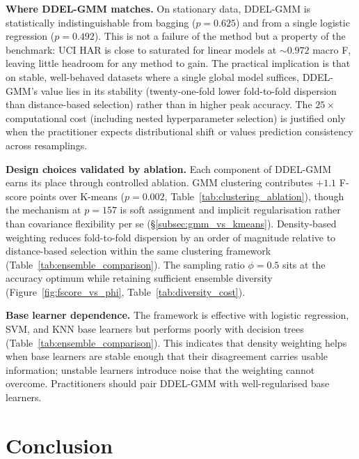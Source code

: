 \documentclass[lettersize,journal]{IEEEtran}
\begin{document}
	\textbf{Where DDEL-GMM matches.} On stationary data, DDEL-GMM is statistically indistinguishable from bagging ($p = 0.625$) and from a single logistic regression ($p = 0.492$). This is not a failure of the method but a property of the benchmark: UCI HAR is close to saturated for linear models at $\sim 0.972$ macro F, leaving little headroom for any method to gain. The practical implication is that on stable, well-behaved datasets where a single global model suffices, DDEL-GMM's value lies in its stability (twenty-one-fold lower fold-to-fold dispersion than distance-based selection) rather than in higher peak accuracy. The $25\times$ computational cost (including nested hyperparameter selection) is justified only when the practitioner expects distributional shift or values prediction consistency across resamplings.
	
	\textbf{Design choices validated by ablation.} Each component of DDEL-GMM earns its place through controlled ablation. GMM clustering contributes $+1.1$ F-score points over K-means ($p = 0.002$, Table~\ref{tab:clustering_ablation}), though the mechanism at $p = 157$ is soft assignment and implicit regularisation rather than covariance flexibility per se (\S\ref{subsec:gmm_vs_kmeans}). Density-based weighting reduces fold-to-fold dispersion by an order of magnitude relative to distance-based selection within the same clustering framework (Table~\ref{tab:ensemble_comparison}). The sampling ratio $\phi = 0.5$ sits at the accuracy optimum while retaining sufficient ensemble diversity (Figure~\ref{fig:fscore_vs_phi}, Table~\ref{tab:diversity_cost}).
	
	\textbf{Base learner dependence.} The framework is effective with logistic regression, SVM, and KNN base learners but performs poorly with decision trees (Table~\ref{tab:ensemble_comparison}). This indicates that density weighting helps when base learners are stable enough that their disagreement carries usable information; unstable learners introduce noise that the weighting cannot overcome. Practitioners should pair DDEL-GMM with well-regularised base learners.
	\section{Conclusion}
	\noindent
	
\end{document}
